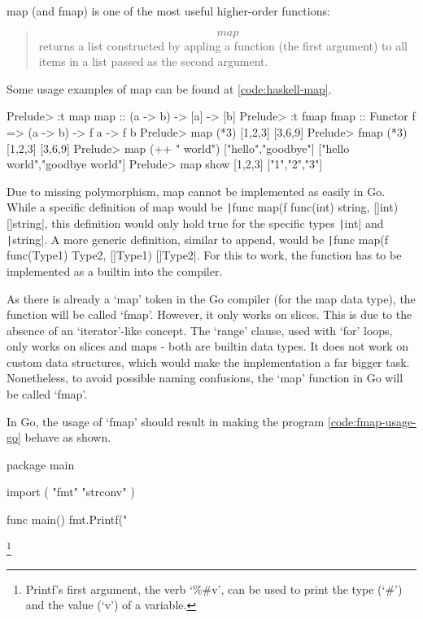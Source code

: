 map (and fmap) is one of the most useful higher-order functions:
\begin{quote}
    \[map\] returns a list constructed by appling a function (the first argument) to all
    items in a list passed as the second argument\autocite{haskell-map}.
\end{quote}

Some usage examples of map can be found at \ref{code:haskell-map}.
\begin{code}
    \label{code:haskell-map}
    \begin{haskellcode}
Prelude> :t map
map :: (a -> b) -> [a] -> [b]
Prelude> :t fmap
fmap :: Functor f => (a -> b) -> f a -> f b
Prelude> map (*3) [1,2,3]
[3,6,9]
Prelude> fmap (*3) [1,2,3]
[3,6,9]
Prelude> map (++ " world") ["hello","goodbye"]
["hello world","goodbye world"]
Prelude> map show [1,2,3]
["1","2","3"]
    \end{haskellcode}
\end{code}

Due to missing polymorphism, map cannot be implemented as easily in Go. While
a specific definition of map would be
\texttt|func map(f func(int) string, []int) []string|,
this definition would only hold true for the specific types \texttt|int|
and \texttt|string|. A more generic definition, similar to append,
would be \texttt|func map(f func(Type1) Type2, []Type1) []Type2|. For
this to work, the function has to be implemented as a builtin into the compiler.

As there is already a `map' token in the Go compiler (for the map data type),
the function will be called `fmap'. However, it only works on slices. This is due
to the absence of an `iterator'-like concept. The `range' clause, used with
`for' loops, only works on slices and maps - both are builtin data types. It does
not work on custom data structures, which would make the implementation a far
bigger task.
Nonetheless, to avoid possible naming confusions, the `map' function in Go will
be called `fmap'.

In Go, the usage of `fmap' should result in making the program \ref{code:fmap-usage-go}
behave as shown.

\begin{code}
    \label{code:fmap-usage-go}
    \begin{gocode}
package main

import (
        "fmt"
        "strconv"
)

func main() {
        fmt.Printf("%
}
\end{gocode}
\footnote{Printf's first argument, the verb `\%\#v', can be used to print the type
(`\#') and the value (`v') of a variable\autocite{fmt-godoc}.}
\end{code}

